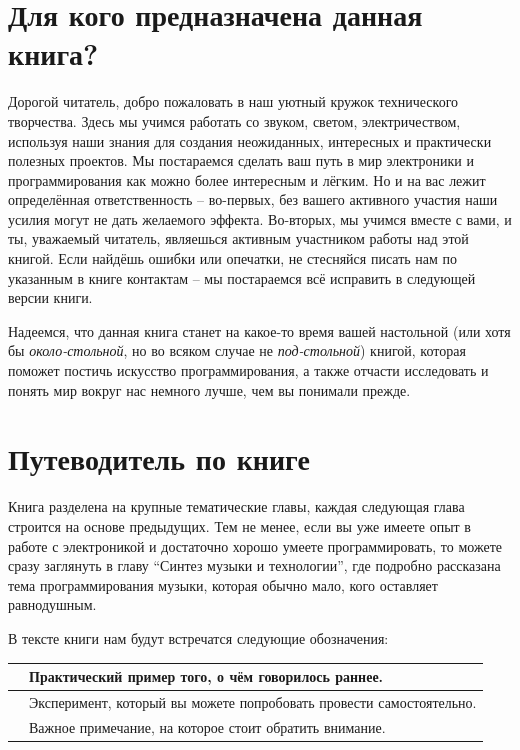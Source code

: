 \documentclass[../sparc.tex]{subfiles}
\begin{document}
\section*{Для кого предназначена данная книга?}

Дорогой читатель, добро пожаловать в наш уютный кружок технического творчества.
Здесь мы учимся работать со звуком, светом, электричеством, используя наши
знания для создания неожиданных, интересных и практически полезных проектов. Мы
постараемся сделать ваш путь в мир электроники и программирования как можно
более интересным и лёгким. Но и на вас лежит определённая ответственность --
во-первых, без вашего активного участия наши усилия могут не дать желаемого
эффекта. Во-вторых, мы учимся вместе с вами, и ты, уважаемый читатель, являешься
активным участником работы над этой книгой. Если найдёшь ошибки или опечатки, не
стесняйся писать нам по указанным в книге контактам -- мы постараемся всё
исправить в следующей версии книги.

Надеемся, что данная книга станет на какое-то время вашей настольной (или хотя
бы \emph{около-стольной}, но во всяком случае не \emph{под-стольной}) книгой,
которая поможет постичь искусство программирования, а также отчасти исследовать
и понять мир вокруг нас немного лучше, чем вы понимали прежде.

\section*{Путеводитель по книге}

Книга разделена на крупные тематические главы, каждая следующая глава строится
на основе предыдущих.  Тем не менее, если вы уже имеете опыт в работе с
электроникой и достаточно хорошо умеете программировать, то можете сразу
заглянуть в главу ``Синтез музыки и технологии'', где подробно рассказана тема
программирования музыки, которая обычно мало,  кого оставляет равнодушным.

В тексте книги нам будут встречатся следующие обозначения:

\begin{table}[H]
  \centering
  \def\arraystretch{3.0}%
  \begin{tabular}{|m{4em}|m{24em}|}
    \hline
    
    & Практический пример того, о чём говорилось раннее. \\
    \hline
    
    & Эксперимент, который вы можете попробовать провести самостоятельно. \\
    \hline
    
    & Важное примечание, на которое стоит обратить внимание. \\
    \hline
  \end{tabular}
\end{table}
\end{document}
